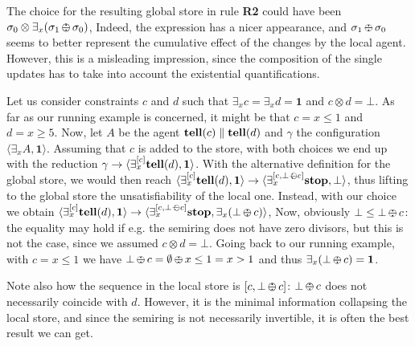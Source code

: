\documentclass{llncs}
\newcommand{\tell}{{\bf tell}}
\newcommand{\ostop}{{\bf stop}}
\def\monid{{\mathbf 0}}
\def\odiv{\, {\ominus\hspace{-7.7pt} \div} \,}
\def\monid{\mathbf{1}}
\begin{document}
\begin{remark}
[TO BE REDONE]
The choice for the resulting global store in rule {\bf R2} could have been 
$\sigma_0 \otimes \exists_x(\sigma_1 \odiv \sigma _0)$, 
Indeed, the expression has a nicer appearance,
%
and $\sigma_1 \odiv \sigma_0$ seems to better represent the cumulative effect of the
changes by the local agent.
However, this is a misleading impression, since the composition of the single updates
has to take into account the existential quantifications.

Let us consider constraints $c$ and $d$ such that $\exists_x c = \exists_x d = \monid$ and $c \otimes d = \bot$.
As far as our running example is concerned, it might be that $c = x \leq 1$ and $d = x \geq 5$. 
Now, let $A$ be the agent $\hbox{\tell}(c) \parallel \hbox{\tell}(d)$ and $\gamma$ the configuration 
$\langle \exists_x A, \monid \rangle$.
Assuming that $c$ is added to the store, with both choices we end up with the reduction
$\gamma \to \langle \exists_x^{[ c ]} \hbox{\tell}(d), \monid \rangle$.
With the alternative definition for the global store, we would then reach 
 $\langle \exists_x^{[c]} \hbox{\tell}(d), \monid \rangle \to \langle \exists_x^{[c,\bot \odiv c]} \hbox{\ostop}, \bot \rangle$,
 thus lifting to the global store the unsatisfiability of the local one.
 Instead, with our choice we obtain 
 $\langle \exists_x^{[c]} \hbox{\tell}(d), \monid \rangle \to \langle \exists_x^{[c,\bot \odiv c]} \hbox{\ostop}, \exists_x (\bot \odiv c) \rangle$, 
Now, obviously $\bot \leq \bot \odiv c$: the equality may hold if e.g. the semiring does not have zero divisors, 
but this is not the case, since we assumed $c \otimes d = \bot$.
Going back to our running example, with $c = x \leq 1$ we have $\bot \odiv c = \emptyset \odiv x \leq 1 = x > 1$
and thus $\exists_x (\bot \odiv c) = \monid$.

Note also how the sequence in the local store is $[c,\bot \odiv c]$: $\bot \odiv c$ does not necessarily coincide with $d$.
However, it is the minimal information collapsing the local store, and since the semiring is not 
necessarily invertible, it is often the best result we can get.
\end{remark}
\end{document}
